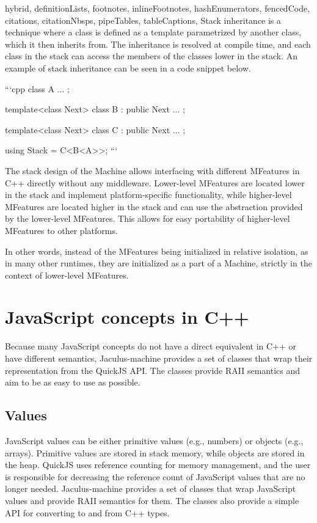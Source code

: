 \begin{markdown*}{%
  hybrid,
  definitionLists,
  footnotes,
  inlineFootnotes,
  hashEnumerators,
  fencedCode,
  citations,
  citationNbsps,
  pipeTables,
  tableCaptions,
}
Stack inheritance is a technique where a class is defined as a template parametrized by another class, which it then inherits from. The inheritance is resolved at compile time, and each class in the stack can access the members of the classes lower in the stack. An example of stack inheritance can be seen in a code snippet below.

```cpp
class A { ... };

template<class Next>
class B : public Next { ... };

template<class Next>
class C : public Next { ... };

using Stack = C<B<A>>;
```

The stack design of the Machine allows interfacing with different MFeatures in C++ directly without any middleware. Lower-level MFeatures are located lower in the stack and implement platform-specific functionality, while higher-level MFeatures are located higher in the stack and can use the abstraction provided by the lower-level MFeatures. This allows for easy portability of higher-level MFeatures to other platforms.

In other words, instead of the MFeatures being initialized in relative isolation, as in many other runtimes, they are initialized as a part of a Machine, strictly in the context of lower-level MFeatures.

\section{JavaScript concepts in C++}

Because many JavaScript concepts do not have a direct equivalent in C++ or have different semantics, Jaculus-machine provides a set of classes that wrap their representation from the QuickJS API. The classes provide RAII semantics and aim to be as easy to use as possible.

\subsection{Values}

JavaScript values can be either primitive values (e.g., numbers) or objects (e.g., arrays). Primitive values are stored in stack memory, while objects are stored in the heap. QuickJS uses reference counting for memory management, and the user is responsible for decreasing the reference count of JavaScript values that are no longer needed. Jaculus-machine provides a set of classes that wrap JavaScript values and provide RAII semantics for them. The classes also provide a simple API for converting to and from C++ types.


\end{markdown*}
